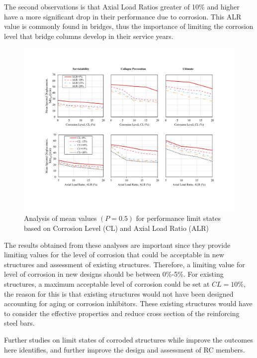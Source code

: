 The second observations is that Axial Load Ratios greater of 10\% and higher have a more significant drop in their performance due to corrosion. This ALR value is commonly found in bridges, thus the importance of limiting the corrosion level that bridge columns develop in their service years.

\begin{figure}[htbp]
	\centering
	\includegraphics[width=1.0\textwidth]{VAC Thesis 2.0/Chapter-5/figs/Analysis_of_Mean_SDs.pdf}
	\caption{Analysis of mean values $(P=0.5)$ for performance limit states based on Corrosion Level (CL) and Axial Load Ratio (ALR) }
	\label{fig:mean_prob_vs_CL}
\end{figure}

The results obtained from these analyses are important since they provide limiting values for the level of corrosion that could be acceptable in new structures and assessment of existing structures. Therefore, a limiting value for level of corrosion in new designs should be between 0\%-5\%. For existing structures, a maximum acceptable level of corrosion could be set at $CL=10\%$, the reason for this is that existing structures would not have been designed accounting for aging or corrosion inhibitors. These existing structures would have to consider the effective properties and reduce cross section of the reinforcing steel bars. 

Further studies on limit states of corroded structures while improve the outcomes here identifies, and further improve the design and assessment of RC members.

\newpage

